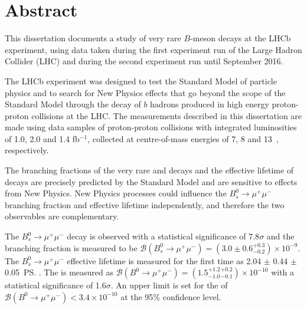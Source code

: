 \chapter{Abstract}

This dissertation documents a study of very rare $B$-meson decays at the LHCb experiment, using data taken during the first experiment run of the Large Hadron Collider (LHC) and during the second experiment run until September 2016.



The LHCb experiment was designed to test the Standard Model of particle physics and to search for New Physics effects that go beyond the scope of the Standard Model through the decay of $b$ hadrons produced in high energy proton-proton collisions at the LHC. The measurements described in this dissertation are made using data samples of proton-proton collisions with integrated luminosities of 1.0, 2.0 and 1.4 fb$^{-1}$, collected at centre-of-mass energies of 7, 8 and 13~\tev, respectively. %

The branching fractions of the very rare \bdmumu and \bsmumu decays and the effective lifetime of \bsmumu decays are precisely predicted by the Standard Model and are sensitive to effects from New Physics. 
New Physics processes could influence the $B_{s}^{0} \to \mu^{+} \mu^{-}$  branching fraction and effective lifetime independently, and therefore the two observables are complementary. %




The $B_{s}^{0} \to \mu^{+} \mu^{-}$ decay is observed with a statistical significance of 7.8$\sigma$ and the branching fraction is measured to be $\mathcal{B}(B_{s}^{0} \to \mu^{+} \mu^{-}) = (3.0 \pm 0.6^{ +0.3}_{ -0.2}) \times 10^{-9}$. The $B_{s}^{0} \to \mu^{+} \mu^{-}$ effective lifetime is measured for the first time as 2.04 $\pm$ 0.44 $\pm$ 0.05~\ps.
The \bdmumu \BF is measured as $\mathcal{B}(B^{0} \to \mu^{+} \mu^{-}) = (1.5^{+1.2}_{-1.0}^{+0.2}_{-0.1})\times 10^{-10}$ with a statistical significance of 1.6$\sigma$. An upper limit is set for the \BF of $\mathcal{B}(B^{0} \to \mu^{+} \mu^{-})< 3.4 \times 10^{-10}$ at the 95$\%$ confidence level. 

